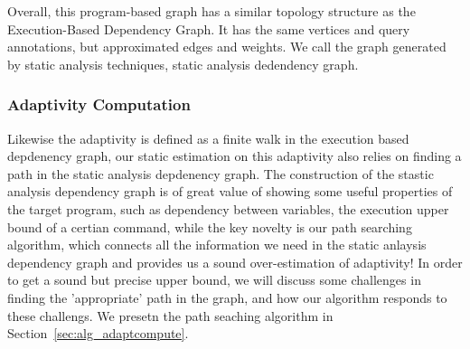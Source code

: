 Overall, this program-based graph has a similar topology structure as 
the Execution-Based Dependency Graph. It has the same
vertices and query annotations, but approximated edges and weights. We call the graph generated by static analysis techniques, static analysis dedendency graph. 


\subsubsection{Adaptivity Computation}

Likewise the adaptivity is defined as a finite walk in the execution based depdenency graph, our static estimation on this adaptivity also relies on finding a path in the static analysis depdenency graph.   The construction of the stastic analysis dependency graph is of great value of showing some useful properties of the target program, such as dependency between variables, the execution upper bound of a certian command, while the key novelty is our path searching algorithm, which connects all the information we need in the static anlaysis dependency graph and provides us a sound over-estimation of adaptivity! In order to get a sound but precise upper bound, we will discuss some challenges in finding the 'appropriate' path in the graph, and how our algorithm responds to these challengs. We presetn the path seaching algorithm in Section~\ref{sec:alg_adaptcompute}.
 

